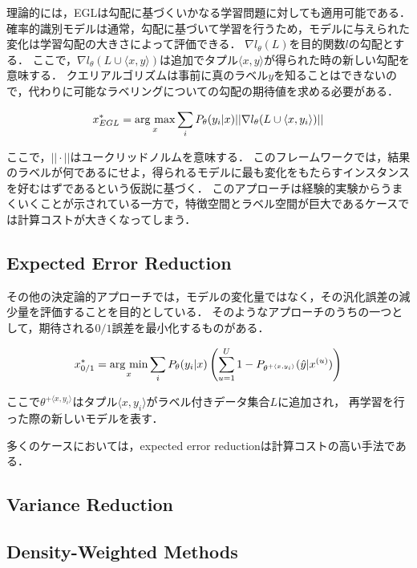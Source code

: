 \documentclass[11pt]{report}
\newcommand{\argmax}{\mathop{\rm arg~max}\limits}
\newcommand{\argmin}{\mathop{\rm arg~min}\limits}
\begin{document}
理論的には，EGLは勾配に基づくいかなる学習問題に対しても適用可能である．
確率的識別モデルは通常，勾配に基づいて学習を行うため，モデルに与えられた変化は学習勾配の大きさによって評価できる．
$\nabla l_{\theta}(L)$を目的関数$l$の勾配とする．
ここで，$\nabla l_{\theta}(L \cup \langle x, y\rangle)$は追加でタプル$\langle x, y \rangle$が得られた時の新しい勾配を意味する．
クエリアルゴリズムは事前に真のラベル$y$を知ることはできないので，代わりに可能なラベリングについての勾配の期待値を求める必要がある．

\begin{equation}
    x_{EGL}^* = \argmax_{x} \sum_{i} P_{\theta}(y_i|x) || \nabla l_{\theta}(L \cup \langle x, y_i \rangle)||
\end{equation}

ここで，$||\cdot||$はユークリッドノルムを意味する．
このフレームワークでは，結果のラベルが何であるにせよ，得られるモデルに最も変化をもたらすインスタンスを好むはずであるという仮説に基づく．
このアプローチは経験的実験からうまくいくことが示されている一方で，特徴空間とラベル空間が巨大であるケースでは計算コストが大きくなってしまう．

\subsection{Expected Error Reduction}
その他の決定論的アプローチでは，モデルの変化量ではなく，その汎化誤差の減少量を評価することを目的としている．
そのようなアプローチのうちの一つとして，期待される$0/1$誤差を最小化するものがある．

\begin{equation}
    x_{0/1}^* = \argmin_{x} \sum_{i} P_{\theta}(y_i|x) \left(\sum^U_{u=1} 1 - P_{\theta^{+\langle x, y_i \rangle}}(\hat{y}|x^{(u)})\right)
\end{equation}

ここで$\theta^{+\langle x, y_i \rangle}$はタプル$\langle x, y_i \rangle$がラベル付きデータ集合$L$に追加され，
再学習を行った際の新しいモデルを表す．

多くのケースにおいては，expected error reductionは計算コストの高い手法である．

\subsection{Variance Reduction}
\subsection{Density-Weighted Methods}
\end{document}
